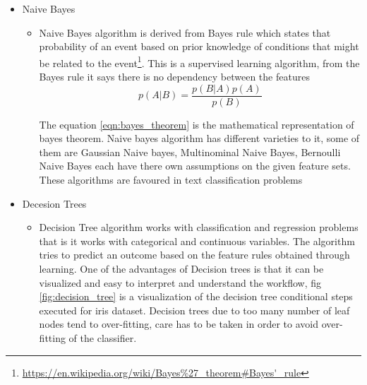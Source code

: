 \begin{itemize}
    \item Naive Bayes 
    \begin{itemize}
        \item Naive Bayes algorithm is derived from Bayes rule which states that probability of an event based on prior knowledge  of conditions that might be related to the event\footnote{\url{https://en.wikipedia.org/wiki/Bayes\%27_theorem#Bayes'_rule}}. This is a supervised learning algorithm, from the Bayes rule it says there is no dependency between the features 
        \begin{equation}
            p(A|B) = \frac{p(B|A)  p(A)}{ p(B)} 
            \label{eqn:bayes_theorem}
        \end{equation}
        
        The equation \ref{eqn:bayes_theorem} is the mathematical representation of bayes theorem.
        Naive bayes algorithm has different varieties to it, some of them are Gaussian Naive bayes, Multinominal Naive Bayes, Bernoulli Naive Bayes each have there own assumptions on the given feature sets. These algorithms are favoured in text classification problems
      
    \end{itemize}
    
 \item Decesion Trees
    \begin{itemize}
            \item Decision Tree algorithm works with classification and regression problems that is it works with categorical and continuous variables. The algorithm tries to predict an outcome based on the feature rules obtained through learning. One of the advantages of Decision trees is that it can be visualized and easy to interpret and understand the workflow, fig \ref{fig:decision_tree} is a visualization of the decision tree conditional steps executed for iris dataset. Decision trees due to too many number of leaf nodes tend to over-fitting, care has to be taken in order to avoid over-fitting of the classifier.
            

\end{itemize}
\end{itemize}
